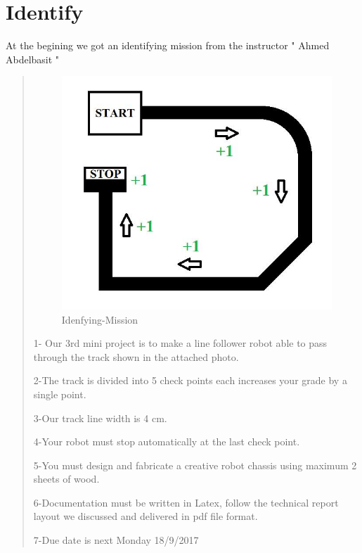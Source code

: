 \documentclass[11pt]{report}
\begin{document}
		
		\section{\textbf{Identify}}
		At the begining we got an identifying mission from the instructor " Ahmed Abdelbasit " \begin{quotation}
  				\begin{figure}[ht]
					\begin{center}
						\includegraphics[scale=0.2]{Ch2-Planning/Idenfying-Mission}
						\caption{Idenfying-Mission}
					\end{center}
			\end{figure}
			
				1- Our 3rd mini project is to make a line follower robot able to pass through the track shown in the attached photo. 
				
				2-The track is divided into 5 check points each increases your grade by a single point.
				
				3-Our track line width is 4 cm.
				
				4-Your robot must stop automatically at the last check point.
				
				5-You must design and fabricate a creative robot chassis using maximum 2 sheets of wood. 
				
				6-Documentation must be written in Latex, follow the technical report layout we discussed and delivered in pdf file format. 
				
				7-Due date is next Monday 18/9/2017 
				
			\end{quotation}
			
\end{document}
